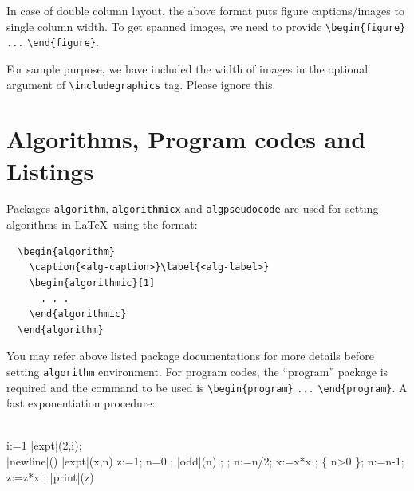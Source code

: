 \documentclass[pdflatex,sn-mathphys]{sn-jnl}%
\theoremstyle{thmstyleone}%
\theoremstyle{thmstyletwo}%
\theoremstyle{thmstylethree}%
\begin{document}
In case of double column layout, the above format puts figure captions/images to single column width.
To get spanned images, we need to provide \verb+\begin{figure}+ \verb+...+ \verb+\end{figure}+.

For sample purpose, we have included the width of images in the optional argument of \verb+\includegraphics+ tag.
Please ignore this.



\section{Algorithms, Program codes and Listings}
\label{sec:algorithms}

Packages \verb+algorithm+, \verb+algorithmicx+ and \verb+algpseudocode+ are used for setting algorithms in \LaTeX\ using the format:

\bigskip
\begin{verbatim}
  \begin{algorithm}
    \caption{<alg-caption>}\label{<alg-label>}
    \begin{algorithmic}[1]
      . . .
    \end{algorithmic}
  \end{algorithm}
\end{verbatim}
\bigskip

You may refer above listed package documentations for more details before setting \verb+algorithm+ environment.
For program codes, the ``program'' package is required and the command to be used is \verb+\begin{program}+ \verb+...+ \verb+\end{program}+.
A fast exponentiation procedure:

\begin{program}
  \BEGIN \\ %
    \FOR i:=1   \DO
       |expt|(2,i); \\ |newline|() \OD %
  \WHERE
  \PROC |expt|(x,n) \BODY
  z:=1;
  \DO \IF n=0 \THEN \EXIT \FI;
  \DO \IF |odd|(n) \THEN \EXIT \FI;
  ;
  n:=n/2;
  x:=x*x \OD;
  \{ n>0 \};
  n:=n-1;
  z:=z*x \OD;
  |print|(z) \ENDPROC
  \END
\end{program}
\end{document}
